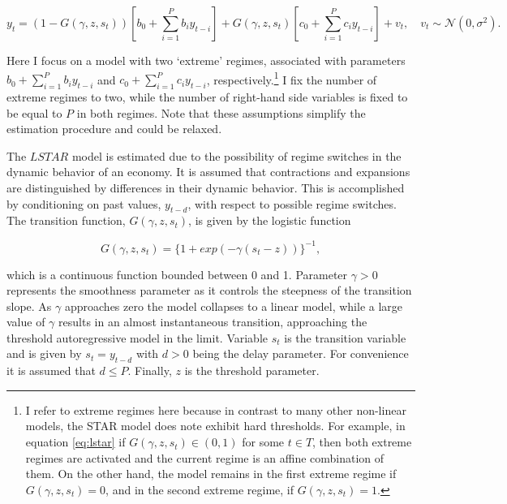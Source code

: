 \documentclass[12pt,letterpaper,fleqn]{article}           %
\begin{document}
\begin{equation}
y_t = (1 - G(\gamma, z, s_t))\left[b_0 + \sum_{i=1}^P b_i y_{t-i}\right] + G(\gamma, z, s_t)\left[c_0 + \sum_{i=1}^P c_i y_{t-i}\right] + v_t, \quad v_t \sim \mathcal{N}(0, \sigma^2).
\label{eq:lstar}
\end{equation}

Here I focus on a model with two `extreme' regimes, associated with parameters $b_0 + \sum_{i=1}^P b_i y_{t-i}$ and $c_0 + \sum_{i=1}^P c_i y_{t-i}$, respectively.\footnote{I refer to extreme regimes here because in contrast to many other non-linear models, the STAR model does note exhibit hard thresholds. For example, in equation \eqref{eq:lstar} if $G(\gamma, z, s_t) \in (0,1)$ for some $t \in T$, then both extreme regimes are activated and the current regime is an affine combination of them. On the other hand, the model remains in the first extreme regime if $G(\gamma, z, s_t) = 0$, and in the second extreme regime, if $G(\gamma, z, s_t) = 1$.} I fix the number of extreme regimes to two, while the number of right-hand side variables is fixed to be equal to $P$ in both regimes. Note that these assumptions simplify the estimation procedure and could be relaxed. 

The $LSTAR$ model is estimated due to the possibility of regime switches in the dynamic behavior of an economy. It is assumed that contractions and expansions are distinguished by differences in their dynamic behavior. This is accomplished by conditioning on past values, $y_{t-d}$, with respect to possible regime switches. The transition function, $G(\gamma, z, s_t)$, is given by the logistic function


\begin{equation}
G(\gamma, z, s_t) = \{1 + exp(-\gamma(s_t - z))\}^{-1},
\end{equation}

which is a continuous function bounded between 0 and 1. Parameter $\gamma > 0$ represents the smoothness parameter as it controls the steepness of the transition slope. As $\gamma$ approaches zero the model collapses to a linear model, while a large value of $\gamma$ results in an almost instantaneous transition, approaching the threshold autoregressive model in the limit. Variable $s_t$ is the transition variable and is given by $s_t = y_{t-d}$ with $d > 0$ being the delay parameter. For convenience it is assumed that $d \leq P$. %
Finally, $z$ is the threshold parameter.
\end{document}
